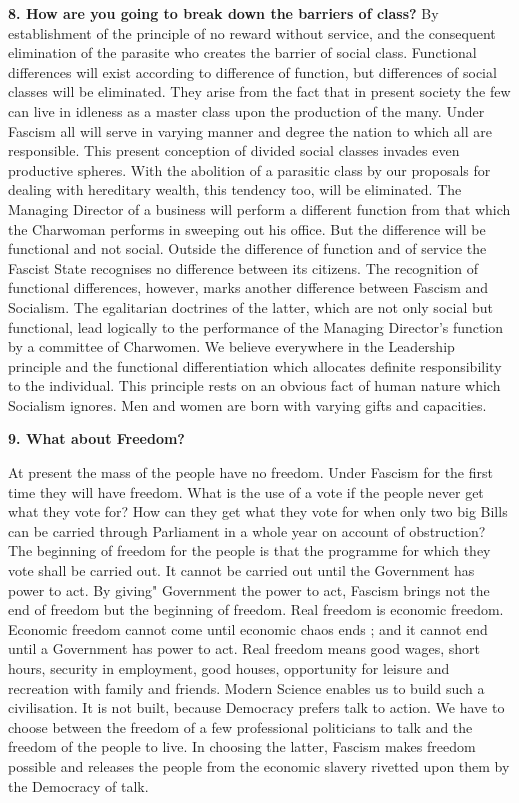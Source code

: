 \documentclass{book}
\begin{document}
\begin{flushleft}
\textbf{8. How are you going to break down the barriers of class?}
By establishment of the principle of no reward without service, and the consequent elimination
of the parasite who creates the barrier of social class. Functional differences will exist according
to difference of function, but differences of social classes will be eliminated. They arise from the
fact that in present society the few can live in idleness as a master class upon the production of
the many. Under Fascism all will serve in varying manner and degree the nation to which all are
responsible.
This present conception of divided social classes invades even productive spheres. With the
abolition of a parasitic class by our proposals for dealing with hereditary wealth, this tendency
too, will be eliminated. The Managing Director of a business will perform a different function
from that which the Charwoman performs in sweeping out his office. But the difference will be
functional and not social. Outside the difference of function and of service the Fascist State
recognises no difference between its citizens. The recognition of functional differences, however,
marks another difference between Fascism and Socialism. The egalitarian doctrines of the latter,
which are not only social but functional, lead logically to the performance of the Managing
Director's function by a committee of Charwomen.
We believe everywhere in the Leadership principle and the functional differentiation which
allocates definite responsibility to the individual. This principle rests on an obvious fact of
human nature which Socialism ignores. Men and women are born with varying gifts and
capacities.
\end{flushleft}
\begin{flushright}
\textbf{9. What about Freedom?}

At present the mass of the people have no freedom. Under Fascism for the first time they will
have freedom. What is the use of a vote if the people never get what they vote for? How can
they get what they vote for when only two big Bills can be carried through Parliament in a whole
year on account of obstruction? The beginning of freedom for the people is that the programme
for which they vote shall be carried out. It cannot be carried out until the Government has power
to act. By giving" Government the power to act, Fascism brings not the end of freedom but the
beginning of freedom. Real freedom is economic freedom. Economic freedom cannot come until
economic chaos ends ; and it cannot end until a Government has power to act.
Real freedom means good wages, short hours, security in employment, good houses, opportunity
for leisure and recreation with family and friends. Modern Science enables us to build such a
civilisation. It is not built, because Democracy prefers talk to action. We have to choose between
the freedom of a few professional politicians to talk and the freedom of the people to live. In
choosing the latter, Fascism makes freedom possible and releases the people from the economic slavery rivetted upon them by the
Democracy of talk.
\end{flushright}
\end{document}
